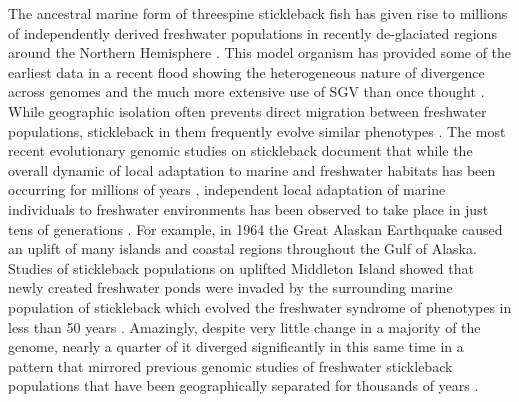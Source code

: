 \documentclass{article}
\begin{document}
The ancestral marine form of threespine stickleback fish has given rise to millions of independently derived freshwater populations in recently de-glaciated regions around the Northern Hemisphere 
\citep{Bell_1994, Thompson_1997, Cresko_2007}. 
This model organism has provided some of the earliest data in a recent flood showing the heterogeneous nature of divergence across genomes 
and the much more extensive use of SGV than once thought 
\citep{schluter2009genetics, Roesti_2014, Nelson_2018, Bassham_2018, Nelson_2019, Hohenlohe_2010, Terekhanova_2014, Marques_2016}.  
While geographic isolation often prevents direct migration between freshwater populations, stickleback in them frequently evolve similar phenotypes 
\citep{Cresko_2004, Colosimo_2004}. 
The most recent evolutionary genomic studies on stickleback document that while the overall dynamic of local adaptation to marine and freshwater habitats has been occurring for millions of years 
\citep{Nelson_2018}, independent local adaptation of marine individuals to freshwater environments has been observed to take place in just tens of generations \citep{Terekhanova_2014, Lescak2015evolution, Bassham_2018}. 
For example, in 1964 the Great Alaskan Earthquake caused an uplift of many islands and coastal regions throughout the Gulf of Alaska. 
Studies of stickleback populations on uplifted Middleton Island showed that newly created freshwater ponds were invaded by the surrounding marine population of stickleback which evolved the freshwater syndrome of phenotypes in less than 50 years 
\citep{Lescak2015evolution, Bassham_2018}. 
Amazingly, despite very little change in a majority of the genome, nearly a quarter of it diverged significantly in this same time in a pattern that mirrored previous genomic studies of freshwater stickleback populations that have been geographically separated for thousands of years 
\citep{Hohenlohe_2010, Bassham_2018}. 
\end{document}
